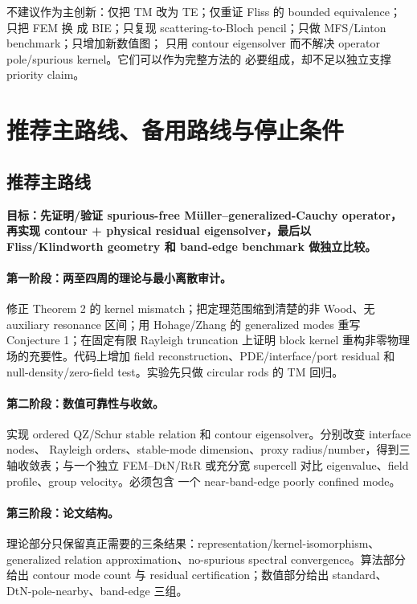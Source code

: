 \documentclass[UTF8,11pt,fontset=none]{ctexart}
\begin{document}
不建议作为主创新：仅把 TM 改为 TE；仅重证 Fliss 的 bounded equivalence；只把 FEM 换
成 BIE；只复现 scattering-to-Bloch pencil；只做 MFS/Linton benchmark；只增加新数值图；
只用 contour eigensolver 而不解决 operator pole/spurious kernel。它们可以作为完整方法的
必要组成，却不足以独立支撑 priority claim。

\section{推荐主路线、备用路线与停止条件}

\subsection{推荐主路线}

\textbf{目标：先证明/验证 spurious-free Müller--generalized-Cauchy operator，再实现
contour + physical residual eigensolver，最后以 Fliss/Klindworth geometry 和 band-edge
benchmark 做独立比较。}

\paragraph{第一阶段：两至四周的理论与最小离散审计。}
修正 Theorem 2 的 kernel mismatch；把定理范围缩到清楚的非 Wood、无 auxiliary
resonance 区间；用 Hohage/Zhang 的 generalized modes 重写 Conjecture 1；在固定有限
Rayleigh truncation 上证明 block kernel 重构非零物理场的充要性。代码上增加 field
reconstruction、PDE/interface/port residual 和 null-density/zero-field test。实验先只做
circular rods 的 TM 回归。

\paragraph{第二阶段：数值可靠性与收敛。}
实现 ordered QZ/Schur stable relation 和 contour eigensolver。分别改变 interface nodes、
Rayleigh orders、stable-mode dimension、proxy radius/number，得到三轴收敛表；与一个独立
FEM--DtN/RtR 或充分宽 supercell 对比 eigenvalue、field profile、group velocity。必须包含
一个 near-band-edge poorly confined mode。

\paragraph{第三阶段：论文结构。}
理论部分只保留真正需要的三条结果：representation/kernel-isomorphism、generalized
relation approximation、no-spurious spectral convergence。算法部分给出 contour mode
count 与 residual certification；数值部分给出 standard、DtN-pole-nearby、band-edge 三组。
\end{document}
